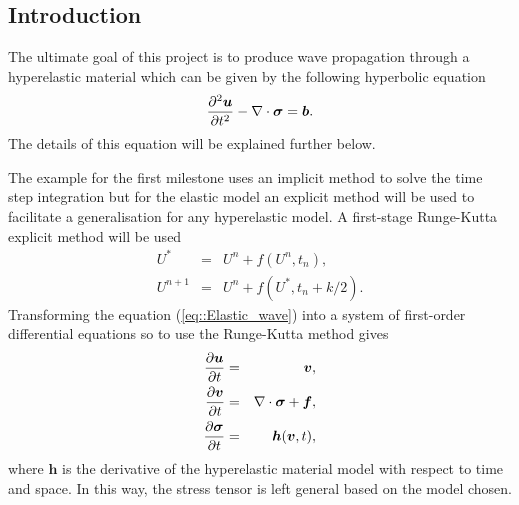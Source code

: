 \subsection{Introduction}
The ultimate goal of this project is to produce wave propagation through a hyperelastic material which can be given by the following hyperbolic equation
\begin{equation}
  \label{eq::Elastic_wave}
  \frac{\partial^2 \bm{u}}{\partial t^2} - \nabla\cdot \bm{\sigma} = \bm{b}.
\end{equation}
The details of this equation will be explained further below.

The example for the first milestone uses an implicit method to solve the time step integration but for the elastic model an explicit method will be used to facilitate a generalisation for any hyperelastic model. A first-stage Runge-Kutta explicit method will be used
\begin{eqnarray*}
  U^* & = & U^n + f(U^n,t_n), \\
  U^{n+1} & = & U^n + f(U^*,t_n+k/2).
\end{eqnarray*}
Transforming the equation (\ref{eq::Elastic_wave}) into a system of first-order differential equations so to use the Runge-Kutta method gives
\begin{eqnarray*}
  \frac{\partial \bm{u}}{\partial t} & = & \bm{v}, \\
  \frac{\partial \bm{v}}{\partial t} & = & \nabla\cdot\bm{\sigma} + \bm{f}, \\
  \frac{\partial \bm{\sigma}}{\partial t} & = & \bm{h}(\bm{v},t),
\end{eqnarray*}
where $\bm{h}$ is the derivative of the hyperelastic material model with respect to time and space. In this way, the stress tensor is left general based on the model chosen.
